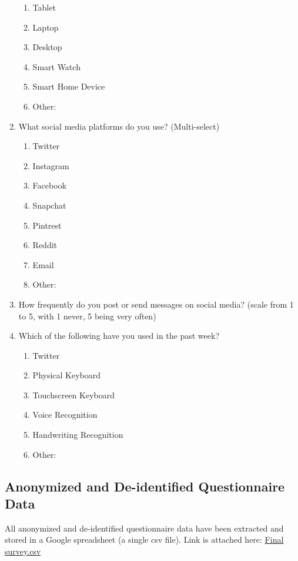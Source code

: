 \documentclass[acmsmall,screen,authorversion,nonacm]{acmart}
\begin{document}
\begin{enumerate}
\begin{enumerate}
            \item Tablet
            \item Laptop
            \item  Desktop
            \item  Smart Watch
            \item Smart Home Device
            \item Other:
        \end{enumerate}
        \item What social media platforms do you use? (Multi-select)
            \begin{enumerate}
                \item Twitter
                \item Instagram
                \item Facebook
                \item Snapchat
                \item Pintrest
                \item Reddit
                \item Email
                \item Other:
            \end{enumerate}
        \item How frequently do you post or send messages on social media? (scale from 1 to 5, with 1 never, 5 being very often)
        \item Which of the following have you used in the past week?
            \begin{enumerate}
                \item Twitter
                \item Physical Keyboard
                \item Touchscreen Keyboard
                \item Voice Recognition
                \item Handwriting Recognition
                \item Other:
            \end{enumerate}
\end{enumerate}


\subsection{Anonymized and De-identified Questionnaire Data}

All anonymized and de-identified questionnaire data have been extracted and stored in a Google spreadsheet (a single csv file). Link is attached here: 
\href{https://drive.google.com/file/d/19dxyiftT2TnLvRKGEes4eAlB25LkpzTD/view?usp=sharing}{Final survey.csv}
\end{document}
